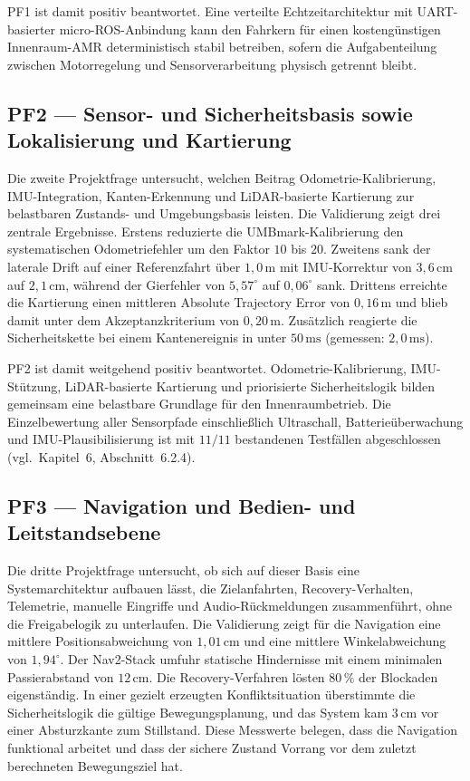 PF1 ist damit positiv beantwortet. Eine verteilte Echtzeitarchitektur mit UART-basierter micro-ROS-Anbindung kann den Fahrkern für einen kostengünstigen Innenraum-AMR deterministisch stabil betreiben, sofern die Aufgabenteilung zwischen Motorregelung und Sensorverarbeitung physisch getrennt bleibt.

\subsection{PF2 — Sensor- und Sicherheitsbasis sowie Lokalisierung und Kartierung}

Die zweite Projektfrage untersucht, welchen Beitrag Odometrie-Kalibrierung, IMU-Integration, Kanten-Erkennung und LiDAR-basierte Kartierung zur belastbaren Zustands- und Umgebungsbasis leisten. Die Validierung zeigt drei zentrale Ergebnisse. Erstens reduzierte die UMBmark-Kalibrierung den systematischen Odometriefehler um den Faktor $10$ bis $20$. Zweitens sank der laterale Drift auf einer Referenzfahrt über $1{,}0\,\mathrm{m}$ mit IMU-Korrektur von $3{,}6\,\mathrm{cm}$ auf $2{,}1\,\mathrm{cm}$, während der Gierfehler von $5{,}57^\circ$ auf $0{,}06^\circ$ sank. Drittens erreichte die Kartierung einen mittleren Absolute Trajectory Error von $0{,}16\,\mathrm{m}$ und blieb damit unter dem Akzeptanzkriterium von $0{,}20\,\mathrm{m}$. Zusätzlich reagierte die Sicherheitskette bei einem Kantenereignis in unter $50\,\mathrm{ms}$ (gemessen: $2{,}0\,\mathrm{ms}$).

PF2 ist damit weitgehend positiv beantwortet. Odometrie-Kalibrierung, IMU-Stützung, LiDAR-basierte Kartierung und priorisierte Sicherheitslogik bilden gemeinsam eine belastbare Grundlage für den Innenraumbetrieb. Die Einzelbewertung aller Sensorpfade einschließlich Ultraschall, Batterieüberwachung und IMU-Plausibilisierung ist mit $11/11$ bestandenen Testfällen abgeschlossen (vgl.\ Kapitel~6, Abschnitt~6.2.4).

\subsection{PF3 — Navigation und Bedien- und Leitstandsebene}

Die dritte Projektfrage untersucht, ob sich auf dieser Basis eine Systemarchitektur aufbauen lässt, die Zielanfahrten, Recovery-Verhalten, Telemetrie, manuelle Eingriffe und Audio-Rückmeldungen zusammenführt, ohne die Freigabelogik zu unterlaufen. Die Validierung zeigt für die Navigation eine mittlere Positionsabweichung von $1{,}01\,\mathrm{cm}$ und eine mittlere Winkelabweichung von $1{,}94^\circ$. Der Nav2-Stack umfuhr statische Hindernisse mit einem minimalen Passierabstand von $12\,\mathrm{cm}$. Die Recovery-Verfahren lösten $80\,\%$ der Blockaden eigenständig. In einer gezielt erzeugten Konfliktsituation überstimmte die Sicherheitslogik die gültige Bewegungsplanung, und das System kam $3\,\mathrm{cm}$ vor einer Absturzkante zum Stillstand. Diese Messwerte belegen, dass die Navigation funktional arbeitet und dass der sichere Zustand Vorrang vor dem zuletzt berechneten Bewegungsziel hat.

